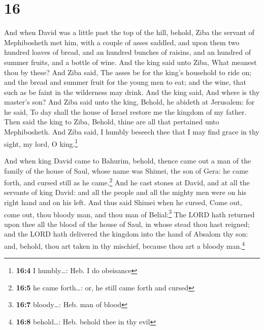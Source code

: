 \hypertarget{section-15}{%
\section{16}\label{section-15}}

 And when David was a little past the top of the hill,
behold, Ziba the servant of Mephibosheth met him, with a couple of asses
saddled, and upon them two hundred loaves of bread, and an hundred
bunches of raisins, and an hundred of summer fruits, and a bottle of
wine.  And the king said unto Ziba, What meanest thou by
these? And Ziba said, The asses be for the king's household to ride on;
and the bread and summer fruit for the young men to eat; and the wine,
that such as be faint in the wilderness may drink.  And
the king said, And where is thy master's son? And Ziba said unto the
king, Behold, he abideth at Jerusalem: for he said, To day shall the
house of Israel restore me the kingdom of my father.  Then
said the king to Ziba, Behold, thine are all that pertained unto
Mephibosheth. And Ziba said, I humbly beseech thee that I may find grace
in thy sight, my lord, O king.\footnote{\textbf{16:4} I humbly\ldots:
  Heb. I do obeisance}

 And when king David came to Bahurim, behold, thence came
out a man of the family of the house of Saul, whose name was Shimei, the
son of Gera: he came forth, and cursed still as he came.\footnote{\textbf{16:5}
  he came forth\ldots: or, he still came forth and cursed}
 And he cast stones at David, and at all the servants of
king David: and all the people and all the mighty men were on his right
hand and on his left.  And thus said Shimei when he
cursed, Come out, come out, thou bloody man, and thou man of
Belial:\footnote{\textbf{16:7} bloody\ldots: Heb. man of blood}
 The LORD hath returned upon thee all the blood of the
house of Saul, in whose stead thou hast reigned; and the LORD hath
delivered the kingdom into the hand of Absalom thy son: and, behold,
thou art taken in thy mischief, because thou art a bloody
man.\footnote{\textbf{16:8} behold\ldots: Heb. behold thee in thy evil}

